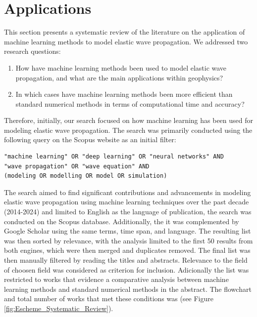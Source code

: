 \documentclass[11pt,twoside]{article}
\begin{document}
\section{Applications}

This section presents a systematic review of the literature on the application of machine learning methods to model 
elastic wave propagation. We addressed two research questions:

\begin{enumerate}
    \item How have machine learning methods been used to model elastic wave propagation, and what are the main applications within geophysics?
    \item In which cases have machine learning methods been more efficient than standard numerical methods in terms of computational time and accuracy?
\end{enumerate} 

Therefore, initially, our search focused on how machine learning has been used for modeling elastic wave propagation. 
The search was primarily conducted using the following query on the Scopus website as an initial filter:

\noindent\begin{verbatim}
"machine learning" OR "deep learning" OR "neural networks" AND 
"wave propagation" OR "wave equation" AND 
(modeling OR modelling OR model OR simulation)
\end{verbatim}    

The search aimed to find significant contributions and advancements in modeling elastic wave propagation using machine learning techniques 
over the past decade (2014-2024) and limited to English as the language of publication, the search was conducted on the Scopus database. 
Additionally, the it was complemented by Google Scholar using the same terms, time span, and language. The resulting 
list was then sorted by relevance, with the analysis limited to the first 50 results from both engines, which were then merged 
and duplicates removed. The final list was then manually filtered by reading the titles and abstracts. Relevance to the field of
choosen field was considered as criterion for inclusion. Adicionally the list was restricted to works that evidence a comparative
analysis between machine learning methods and standard numerical methods in the abstract. The flowchart and total number of 
works that met these conditions was  (see Figure \ref{fig:Escheme_Systematic_Review}). 
\end{document}
